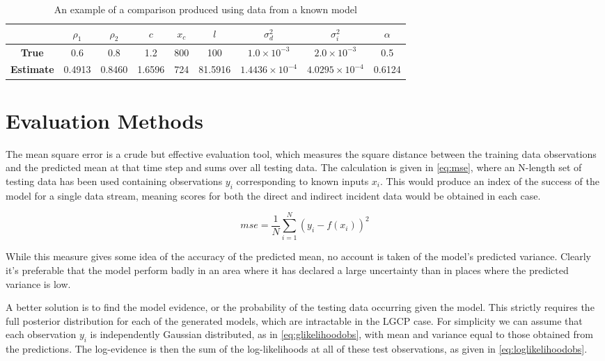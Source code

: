 \documentclass[a4paper,11pt]{report}
\begin{document}
\begin{table}[]
\centering
\caption{An example of a comparison produced using data from a known model}
\label{tab:inmodelcompare}
\begin{tabular}{c|cccccccc}
                  & \(\rho_1\)      & \(\rho_2\)      & \(c\)         & \(x_c\)        & \(l\)         & \(\sigma_d^2\)    & \(\sigma_i^2\)    & \(\alpha\)     \\ \hline
\textbf{True}  &  0.6 &  0.8         &  1.2         &    800       &       100    &    \(1.0 \times 10^{-3} \)      &    \(2.0 \times 10^{-3} \)              &    0.5       \\
\textbf{Estimate} &      0.4913     &    0.8460       &    1.6596       &    724       &     81.5916      &    \(1.4436 \times 10^{-4} \)       &     \(4.0295 \times 10^{-4} \)      &      0.6124     \\ \hline
\end{tabular}
\end{table}

\section{Evaluation Methods}
The mean square error is a crude but effective evaluation tool, which measures the square distance between the training data observations and the predicted mean at that time step and sums over all testing data. The calculation is given in \ref{eq:mse}, where an N-length set of testing data has been used containing observations \(y_i\) corresponding to known inputs \(x_i\). This would produce an index of the success of the model for a single data stream, meaning scores for both the direct and indirect incident data would be obtained in each case. 

\begin{equation} \label{eq:mse}
mse = \frac{1}{N} \sum_{i=1}^{N} (y_i - f(x_i))^2
\end{equation}

While this measure gives some idea of the accuracy of the predicted mean, no account is taken of the model's predicted variance. Clearly it's preferable that the model perform badly in an area where it has declared a large uncertainty than in places where the predicted variance is low. \par

A better solution is to find the model evidence, or the probability of the testing data occurring given the model. This strictly requires the full posterior distribution for each of the generated models, which are intractable in the LGCP case. For simplicity we can assume that each observation \(y_i\) is independently Gaussian distributed, as in \ref{eq:glikelihoodobs}, with mean and variance equal to those obtained from the predictions. The log-evidence is then the sum of the log-likelihoods at all of these test observations, as given in \ref{eq:loglikelihoodobs}.
\end{document}

